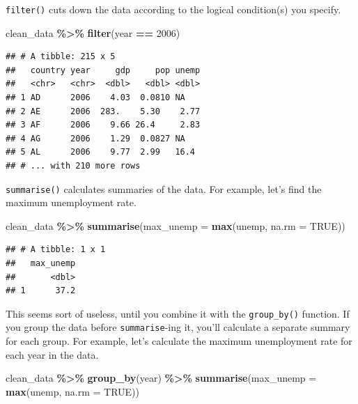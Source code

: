 \documentclass[
  12pt,
  oneside,openany]{book}
\newenvironment{Shaded}{\begin{snugshade}}{\end{snugshade}}
\newcommand{\DataTypeTok}[1]{\textcolor[rgb]{0.13,0.29,0.53}{#1}}
\newcommand{\DecValTok}[1]{\textcolor[rgb]{0.00,0.00,0.81}{#1}}
\newcommand{\KeywordTok}[1]{\textcolor[rgb]{0.13,0.29,0.53}{\textbf{#1}}}
\newcommand{\NormalTok}[1]{#1}
\newcommand{\OperatorTok}[1]{\textcolor[rgb]{0.81,0.36,0.00}{\textbf{#1}}}
\newcommand{\OtherTok}[1]{\textcolor[rgb]{0.56,0.35,0.01}{#1}}
\newcommand{\StringTok}[1]{\textcolor[rgb]{0.31,0.60,0.02}{#1}}
\begin{document}
\texttt{filter()} cuts down the data according to the logical condition(s) you specify.

\begin{Shaded}
\begin{Highlighting}[]
\NormalTok{clean\_data }\OperatorTok{\%>\%}
\StringTok{  }\KeywordTok{filter}\NormalTok{(year }\OperatorTok{==}\StringTok{ }\DecValTok{2006}\NormalTok{)}
\end{Highlighting}
\end{Shaded}

\begin{verbatim}
## # A tibble: 215 x 5
##   country year     gdp     pop unemp
##   <chr>   <chr>  <dbl>   <dbl> <dbl>
## 1 AD      2006    4.03  0.0810 NA   
## 2 AE      2006  283.    5.30    2.77
## 3 AF      2006    9.66 26.4     2.83
## 4 AG      2006    1.29  0.0827 NA   
## 5 AL      2006    9.77  2.99   16.4 
## # ... with 210 more rows
\end{verbatim}

\texttt{summarise()} calculates summaries of the data. For example, let's find the maximum unemployment rate.

\begin{Shaded}
\begin{Highlighting}[]
\NormalTok{clean\_data }\OperatorTok{\%>\%}
\StringTok{  }\KeywordTok{summarise}\NormalTok{(}\DataTypeTok{max\_unemp =} \KeywordTok{max}\NormalTok{(unemp, }\DataTypeTok{na.rm =} \OtherTok{TRUE}\NormalTok{))}
\end{Highlighting}
\end{Shaded}

\begin{verbatim}
## # A tibble: 1 x 1
##   max_unemp
##       <dbl>
## 1      37.2
\end{verbatim}

This seems sort of useless, until you combine it with the \texttt{group\_by()} function. If you group the data before \texttt{summarise}-ing it, you'll calculate a separate summary for each group. For example, let's calculate the maximum unemployment rate for each year in the data.

\begin{Shaded}
\begin{Highlighting}[]
\NormalTok{clean\_data }\OperatorTok{\%>\%}
\StringTok{  }\KeywordTok{group\_by}\NormalTok{(year) }\OperatorTok{\%>\%}
\StringTok{  }\KeywordTok{summarise}\NormalTok{(}\DataTypeTok{max\_unemp =} \KeywordTok{max}\NormalTok{(unemp, }\DataTypeTok{na.rm =} \OtherTok{TRUE}\NormalTok{))}
\end{Highlighting}
\end{Shaded}
\end{document}
